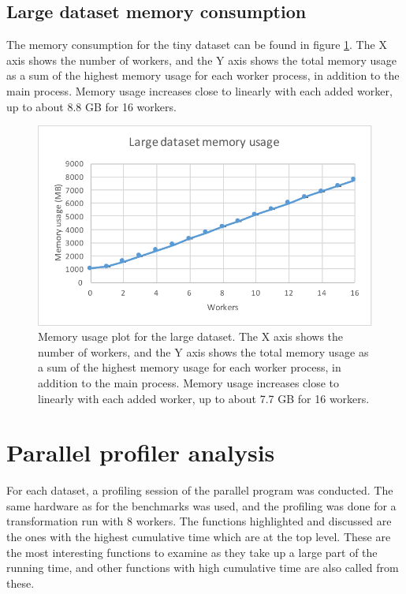 \subsection{Large dataset memory consumption}
The memory consumption for the tiny dataset can be found in figure \ref{fig:dataset_4_memory}.
The X axis shows the number of workers, and the Y axis shows the total memory usage as
a sum of the highest memory usage for each worker process, in addition to the main process. Memory usage increases close to linearly with each added worker,
up to about 8.8 GB for 16 workers.
\begin{figure}[ht]
  \centering
  \includegraphics[width=120mm]{figures/dataset_4/dataset_4_memory.pdf}
  \caption[Memory usage plot for the large dataset.]{Memory usage plot for the large dataset. The X axis shows the number of workers, and the Y axis shows the total memory usage as
  a sum of the highest memory usage for each worker process, in addition to the main process. Memory usage increases close to linearly with each added worker,
  up to about 7.7 GB for 16 workers.}
  \label{fig:dataset_4_memory}
\end{figure}

\FloatBarrier

\section{Parallel profiler analysis}
For each dataset, a profiling session of the parallel program was conducted. The same hardware as for the benchmarks was used, and
the profiling was done for a transformation run with 8 workers. The functions highlighted and discussed are the ones with the highest
cumulative time which are at the top level. These are the most interesting functions to examine as they take up a large part of the
running time, and other functions with high cumulative time are also called from these.

